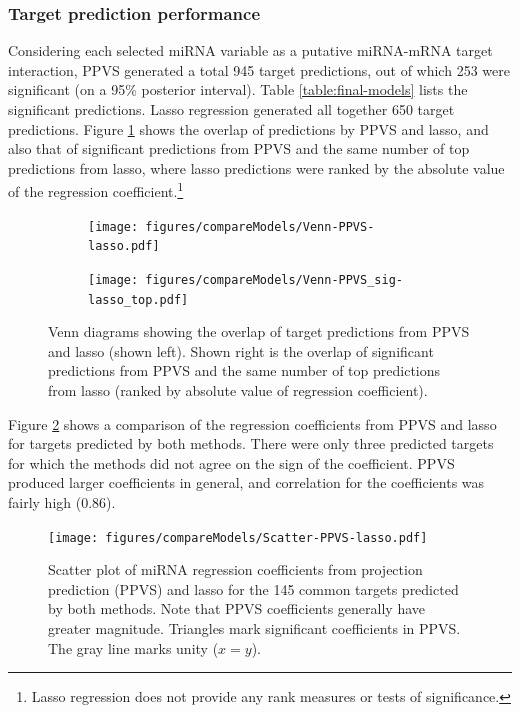 \subsubsection*{Target prediction performance}

Considering each selected miRNA variable as a putative miRNA-mRNA target
interaction, PPVS generated a total 945 target predictions, out of which
253 were significant (on a 95\% posterior interval). Table \ref{table:final-models}
lists the significant predictions.
Lasso regression generated all together 650 target predictions. Figure
\ref{fig:venn} shows the overlap of predictions by PPVS and lasso, and also
that of significant predictions from PPVS and the same number of top
predictions from lasso, where lasso predictions were ranked by the absolute value of
the regression coefficient.\footnote{Lasso regression does not provide any
rank measures or tests of significance.}

\begin{figure}[!h]
  \centering
  \begin{subfigure}{.45\textwidth}
    \centering
    \texttt{[image: figures/compareModels/Venn-PPVS-lasso.pdf]}
  \end{subfigure}
  \begin{subfigure}{.45\textwidth}
    \centering
    \texttt{[image: figures/compareModels/Venn-PPVS\_sig-lasso\_top.pdf]}
  \end{subfigure}

  \caption{Venn diagrams showing the overlap of target predictions from PPVS
  and lasso (shown left). Shown right is the overlap of significant predictions
  from PPVS and the same number of top predictions from lasso (ranked by
  absolute value of regression coefficient).}
  \label{fig:venn}
\end{figure}

Figure \ref{fig:scatter-ppvs-lasso} shows a comparison of the regression
coefficients from PPVS and lasso for targets predicted by both methods. There
were only three predicted targets for which the methods did not agree on the
sign of the coefficient. PPVS produced larger coefficients in general, and
correlation for the coefficients was fairly high ($0.86$).

\begin{figure}[htb]
  \centering
  \texttt{[image: figures/compareModels/Scatter-PPVS-lasso.pdf]}
  \caption{Scatter plot of miRNA regression coefficients from projection
  prediction (PPVS) and lasso for the 145 common targets predicted by both methods.
  Note that PPVS coefficients generally have greater magnitude. Triangles
  mark significant coefficients in PPVS. The gray
  line marks unity ($x=y$).}
  \label{fig:scatter-ppvs-lasso}
\end{figure}


